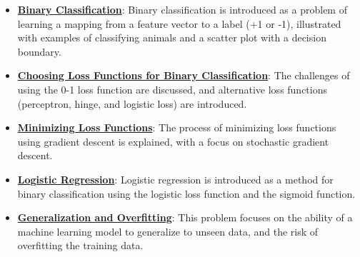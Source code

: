 \documentclass{article}%
\begin{document}
\begin{itemize}[leftmargin=*]
\item \href{https://purdue.brightspace.com/d2l/common/assets/pdfjs-d2l-dist/1.0.14-legacy/web/viewer.html?file=\%2Fcontent\%2Fenforced\%2F1095467-wl.202510.CS.24300.001\%2F05L2-ML Basics.pdf\%3Fou\%3D1095467\&lang=en-us\&container=d2l-fileviewer-rendered-pdf\&fullscreen=d2l-fileviewer-rendered-pdf-dialog\&height=667#page=20}{\textbf{Binary Classification}}: Binary classification is introduced as a problem of learning a mapping from a feature vector to a label (+1 or -1), illustrated with examples of classifying animals and a scatter plot with a decision boundary.%
\item \href{https://purdue.brightspace.com/d2l/common/assets/pdfjs-d2l-dist/1.0.14-legacy/web/viewer.html?file=\%2Fcontent\%2Fenforced\%2F1095467-wl.202510.CS.24300.001\%2F05L2-ML Basics.pdf\%3Fou\%3D1095467\&lang=en-us\&container=d2l-fileviewer-rendered-pdf\&fullscreen=d2l-fileviewer-rendered-pdf-dialog\&height=667#page=25}{\textbf{Choosing Loss Functions for Binary Classification}}: The challenges of using the 0-1 loss function are discussed, and alternative loss functions (perceptron, hinge, and logistic loss) are introduced.%
\item \href{https://purdue.brightspace.com/d2l/common/assets/pdfjs-d2l-dist/1.0.14-legacy/web/viewer.html?file=\%2Fcontent\%2Fenforced\%2F1095467-wl.202510.CS.24300.001\%2F05L2-ML Basics.pdf\%3Fou\%3D1095467\&lang=en-us\&container=d2l-fileviewer-rendered-pdf\&fullscreen=d2l-fileviewer-rendered-pdf-dialog\&height=667#page=28}{\textbf{Minimizing Loss Functions}}: The process of minimizing loss functions using gradient descent is explained, with a focus on stochastic gradient descent.%
\item \href{https://purdue.brightspace.com/d2l/common/assets/pdfjs-d2l-dist/1.0.14-legacy/web/viewer.html?file=\%2Fcontent\%2Fenforced\%2F1095467-wl.202510.CS.24300.001\%2F05L2-ML Basics.pdf\%3Fou\%3D1095467\&lang=en-us\&container=d2l-fileviewer-rendered-pdf\&fullscreen=d2l-fileviewer-rendered-pdf-dialog\&height=667#page=31}{\textbf{Logistic Regression}}: Logistic regression is introduced as a method for binary classification using the logistic loss function and the sigmoid function.%
\item \href{https://purdue.brightspace.com/d2l/common/assets/pdfjs-d2l-dist/1.0.14-legacy/web/viewer.html?file=\%2Fcontent\%2Fenforced\%2F1095467-wl.202510.CS.24300.001\%2F10L1-CrossValidation.pdf\%3Fou\%3D1095467\&lang=en-us\&container=d2l-fileviewer-rendered-pdf\&fullscreen=d2l-fileviewer-rendered-pdf-dialog\&height=667#page=2}{\textbf{Generalization and Overfitting}}: This problem focuses on the ability of a machine learning model to generalize to unseen data, and the risk of overfitting the training data.%

\end{itemize}
\end{document}
